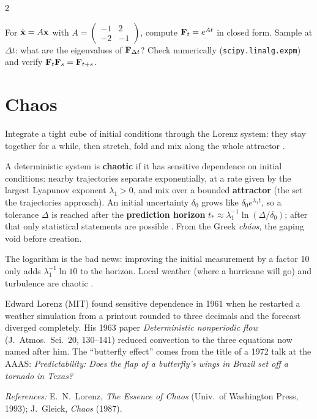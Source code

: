 \begin{paracol}{2}
\begin{exercise}
For $\dot{\mathbf{x}}=A\mathbf{x}$ with $A=\begin{pmatrix}-1&2\\-2&-1\end{pmatrix}$, compute $\mathbf{F}_t=e^{At}$ in
closed form. Sample at $\Delta t$: what are the eigenvalues of $\mathbf{F}_{\Delta t}$? Check numerically
(\texttt{scipy.linalg.expm}) and verify $\mathbf{F}_t\mathbf{F}_s=\mathbf{F}_{t+s}$.
\end{exercise}

\section{Chaos}\label{sec:fu-chaos}

Integrate a tight cube of initial conditions through the Lorenz system: they stay together for a
while, then stretch, fold and mix along the whole attractor .

\begin{definition}
A deterministic system is \textbf{chaotic} if it has sensitive dependence on initial conditions: nearby
trajectories separate exponentially, at a rate given by the largest Lyapunov exponent $\lambda_1>0$, and
mix over a bounded \textbf{attractor} (the set the trajectories approach). An initial uncertainty
$\delta_0$ grows like $\delta_0e^{\lambda_1t}$, so a tolerance $\Delta$ is reached after the
\textbf{prediction horizon} $t_*\approx\lambda_1^{-1}\ln(\Delta/\delta_0)$; after that only statistical
statements are possible . From the Greek \emph{cháos}, the gaping void
before creation.
\end{definition}

The logarithm is the bad news: improving the initial measurement by a factor 10 only adds
$\lambda_1^{-1}\ln10$ to the horizon. Local weather (where a hurricane will go) and turbulence are
chaotic .

\begin{history}
Edward Lorenz (MIT) found sensitive dependence in 1961 when he restarted a weather simulation from a
printout rounded to three decimals and the forecast diverged completely. His 1963 paper
\emph{Deterministic nonperiodic flow} (J.\ Atmos.\ Sci.\ 20, 130--141) reduced convection to the three
equations now named after him. The ``butterfly effect'' comes from the title of a 1972 talk at the AAAS:
\emph{Predictability: Does the flap of a butterfly's wings in Brazil set off a tornado in Texas?}\par
\textit{References:} E.~N.~Lorenz, \emph{The Essence of Chaos} (Univ.\ of Washington Press, 1993);
J.~Gleick, \emph{Chaos} (1987).
\end{history}


\end{paracol}
